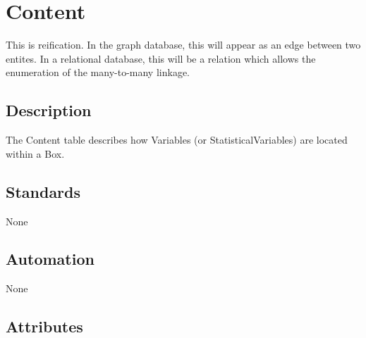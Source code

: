 \section{Content}\label{content}

This is reification. In the graph database, this will appear as an edge
between two entites. In a relational database, this will be a relation
which allows the enumeration of the many-to-many linkage.

\subsection{Description}\label{description-7}

The Content table describes how Variables (or StatisticalVariables) are
located within a Box.

\subsection{Standards}\label{standards-9}

None

\subsection{Automation}\label{automation-9}

None

\subsection{Attributes}\label{attributes-9}


